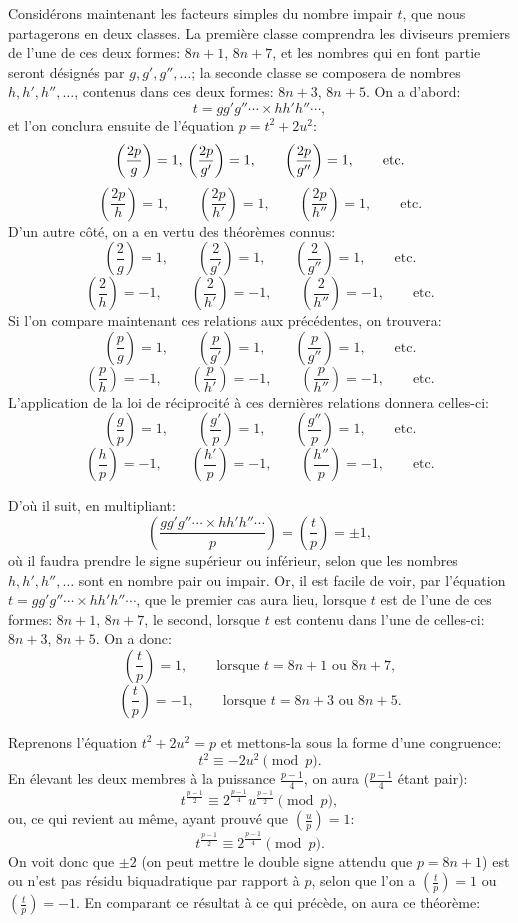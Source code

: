 \documentclass[11pt]{article}
\newcommand{\leg}[2]{\left(\frac{#1}{#2}\right)}
\newcommand{\unitid}[1]{\hypertarget{#1}{}}
\begin{document}
\unitid{dirichlet.v1.p04a.par.009}Considérons maintenant les facteurs simples du nombre impair $t$, que nous partagerons en deux classes. La première classe comprendra les diviseurs premiers de l'une de ces deux formes: $8n+1$, $8n+7$, et les nombres qui en font partie seront désignés par $g,g',g'',\ldots$; la seconde classe se composera de nombres $h,h',h'',\ldots$, contenus dans ces deux formes: $8n+3$, $8n+5$. On a d'abord:
\[
 t=gg'g''\cdots\times hh'h''\cdots,
\]
et l'on conclura ensuite de l'équation $p=t^2+2u^2$:
\[
\leg{2p}{g}=1,\\ \leg{2p}{g'}=1,
\qquad \leg{2p}{g''}=1,\qquad \text{etc.}
\]
\[
\leg{2p}{h}=1,\qquad \leg{2p}{h'}=1,
\qquad \leg{2p}{h''}=1,\qquad \text{etc.}
\]
D'un autre côté, on a en vertu des théorèmes connus:
\[
\leg{2}{g}=1,
\qquad \leg{2}{g'}=1,
\qquad \leg{2}{g''}=1,
\qquad \text{etc.}
\]
\[
\leg{2}{h}=-1,
\qquad \leg{2}{h'}=-1,
\qquad \leg{2}{h''}=-1,
\qquad \text{etc.}
\]
Si l'on compare maintenant ces relations aux précédentes, on trouvera:
\[
\leg{p}{g}=1,
\qquad \leg{p}{g'}=1,
\qquad \leg{p}{g''}=1,
\qquad \text{etc.}
\]
\[
\leg{p}{h}=-1,
\qquad \leg{p}{h'}=-1,
\qquad \leg{p}{h''}=-1,
\qquad \text{etc.}
\]
L'application de la loi de réciprocité à ces dernières relations donnera celles-ci:
\[
\leg{g}{p}=1,
\qquad \leg{g'}{p}=1,
\qquad \leg{g''}{p}=1,
\qquad \text{etc.}
\]
\[
\leg{h}{p}=-1,
\qquad \leg{h'}{p}=-1,
\qquad \leg{h''}{p}=-1,
\qquad \text{etc.}
\]

\unitid{dirichlet.v1.p04a.par.010}D'où il suit, en multipliant:
\[
 \leg{gg'g''\cdots\times hh'h''\cdots}{p}=\leg{t}{p}=\pm1,
\]
où il faudra prendre le signe supérieur ou inférieur, selon que les nombres $h,h',h'',\ldots$ sont en nombre pair ou impair. Or, il est facile de voir, par l'équation $t=gg'g''\cdots\times hh'h''\cdots$, que le premier cas aura lieu, lorsque $t$ est de l'une de ces formes: $8n+1$, $8n+7$, le second, lorsque $t$ est contenu dans l'une de celles-ci: $8n+3$, $8n+5$. On a donc:
\[
\leg{t}{p}=1,\qquad \text{lorsque } t=8n+1\text{ ou }8n+7,
\]
\[
\leg{t}{p}=-1,\qquad \text{lorsque } t=8n+3\text{ ou }8n+5.
\]

\unitid{dirichlet.v1.p04a.par.011}Reprenons l'équation $t^2+2u^2=p$ et mettons-la sous la forme d'une congruence:
\[
 t^2\equiv -2u^2 \pmod p.
\]
En élevant les deux membres à la puissance $\frac{p-1}{4}$, on aura ($\frac{p-1}{4}$ étant pair):
\[
 t^{\frac{p-1}{2}}\equiv 2^{\frac{p-1}{4}}u^{\frac{p-1}{2}}\pmod p,
\]
ou, ce qui revient au même, ayant prouvé que $\leg{u}{p}=1$:
\[
 t^{\frac{p-1}{2}}\equiv 2^{\frac{p-1}{4}}\pmod p.
\]
On voit donc que $\pm2$ (on peut mettre le double signe attendu que $p=8n+1$) est ou n'est pas résidu biquadratique par rapport à $p$, selon que l'on a $\leg{t}{p}=1$ ou $\leg{t}{p}=-1$. En comparant ce résultat à ce qui précède, on aura ce théorème:
\end{document}
